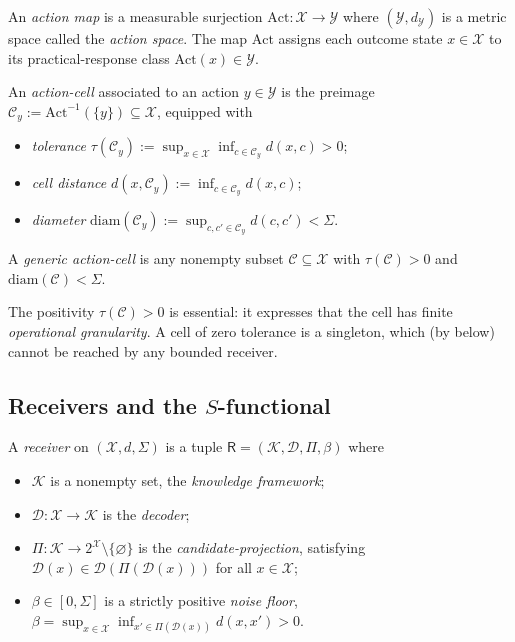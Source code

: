 \documentclass[11pt,a4paper]{article}
\newcommand{\K}{\mathcal{K}}
\newcommand{\D}{\mathcal{D}}
\newcommand{\X}{\mathcal{X}}
\newcommand{\Y}{\mathcal{Y}}
\newcommand{\Cell}{\mathcal{C}}
\newcommand{\receiver}{\mathsf{R}}
\newcommand{\diam}{\mathrm{diam}}
\newcommand{\Action}{\mathrm{Act}}
\begin{document}
\begin{definition}\label{def:action}
An \emph{action map} is a measurable surjection $\Action:\X\to\Y$ where
$(\Y,d_\Y)$ is a metric space called the \emph{action space}. The map
$\Action$ assigns each outcome state $x\in\X$ to its practical-response
class $\Action(x)\in\Y$.
\end{definition}

\begin{definition}\label{def:cell}
An \emph{action-cell} associated to an action $y\in\Y$ is the preimage
$\Cell_y:=\Action^{-1}(\{y\})\subseteq\X$, equipped with
\begin{itemize}[leftmargin=*]
\item \emph{tolerance} $\tau(\Cell_y):=\sup_{x\in\X}\inf_{c\in\Cell_y}
d(x,c)>0$;
\item \emph{cell distance} $d(x,\Cell_y):=\inf_{c\in\Cell_y}d(x,c)$;
\item \emph{diameter} $\diam(\Cell_y):=\sup_{c,c'\in\Cell_y}d(c,c')<\Sigma$.
\end{itemize}
A \emph{generic action-cell} is any nonempty subset $\Cell\subseteq\X$
with $\tau(\Cell)>0$ and $\diam(\Cell)<\Sigma$.
\end{definition}

\begin{remark}\label{rem:cell-positivity}
The positivity $\tau(\Cell)>0$ is essential: it expresses that the cell
has finite \emph{operational granularity}. A cell of zero tolerance is a
singleton, which (by  below) cannot be reached by any
bounded receiver.
\end{remark}

\subsection{Receivers and the $S$-functional}

\begin{definition}[Receiver]\label{def:receiver}
A \emph{receiver} on $(\X,d,\Sigma)$ is a tuple
$\receiver=(\K,\D,\Pi,\beta)$ where
\begin{itemize}[leftmargin=*]
\item $\K$ is a nonempty set, the \emph{knowledge framework};
\item $\D:\X\to\K$ is the \emph{decoder};
\item $\Pi:\K\to 2^\X\setminus\{\varnothing\}$ is the
\emph{candidate-projection}, satisfying
$\D(x)\in\D(\Pi(\D(x)))$ for all $x\in\X$;
\item $\beta\in[0,\Sigma]$ is a strictly positive \emph{noise floor},
$\beta=\sup_{x\in\X}\inf_{x'\in\Pi(\D(x))}d(x,x')>0$.
\end{itemize}
\end{definition}
\end{document}
